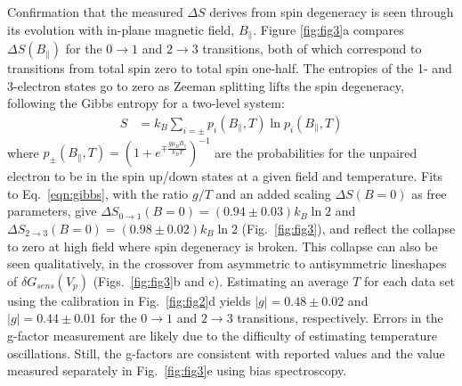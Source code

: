 \documentclass[twocolumn,showpacs,amsmath,amssymb,prl,aps,superscriptaddress]{revtex4-1}
\begin{document}
Confirmation that the measured $\Delta S$ derives from spin degeneracy is seen through its evolution with in-plane magnetic field, $B_\parallel$. Figure \ref{fig:fig3}a compares $\Delta S(B_\parallel)$ for the $0 \rightarrow1 $ and $2 \rightarrow 3$ transitions, both of which correspond to transitions from total spin zero to total spin one-half. The entropies of the 1- and 3-electron states go to zero as Zeeman splitting lifts the spin degeneracy, following the Gibbs entropy for a two-level system:
%
\begin{align}
\label{eqn:gibbs}
        S &= k_B \sum_{i=\pm} p_{i}(B_\parallel, T) \ln{ p_{i}(B_\parallel,T) }
\end{align}
%
where $p_{\pm}(B_\parallel, T) = (1+ e^{\mp \frac{g\mu_B B_{\parallel}}{k_B T}})^{-1}$ are the probabilities for the unpaired electron to be in the spin up/down states at a given field and temperature. Fits to Eq.~\ref{eqn:gibbs}, with the ratio $g/T$ and an added scaling $\Delta S(B=0)$ as free parameters, give $\Delta S_{0 \rightarrow 1}(B=0)=(0.94 \pm 0.03) k_B \ln{2}$ and $\Delta S_{2 \rightarrow 3}(B=0)=(0.98 \pm 0.02) k_B \ln{2}$ (Fig.~\ref{fig:fig3}), and reflect the collapse to zero at high field where spin degeneracy is broken. This collapse can also be seen qualitatively, in the crossover from asymmetric to antisymmetric lineshapes of $\delta G_{sens}(V_p)$ (Figs.~\ref{fig:fig3}b and c). Estimating an average $T$ for each data set using the calibration in Fig.~\ref{fig:fig2}d yields $|g|=0.48 \pm 0.02$ and $|g|=0.44 \pm 0.01 $ for the $0\rightarrow 1$ and $2\rightarrow 3$ transitions, respectively. Errors in the g-factor measurement are likely due to the difficulty of estimating temperature oscillations. Still, the g-factors are consistent with reported values\cite{Cronenwett1998,Hanson2003,Zumbuhl2004} and the value measured separately in Fig.~\ref{fig:fig3}e using bias spectroscopy.
\end{document}
